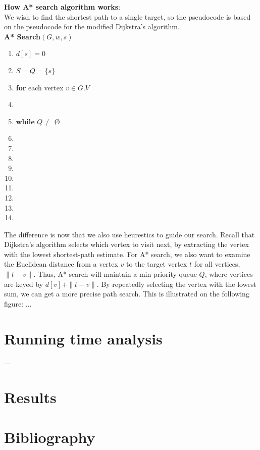 \documentclass[11pt]{article}
\begin{document}
\textbf{How A* search algorithm works}:\\
We wish to find the shortest path to a single target, so the pseudocode is based on the pseudocode for the modified Dijkstra's algorithm.\\

\textbf{A* Search$(G, w, s)$}
\begin{enumerate}
\setlength\itemsep{0em}
\item $d[s] = 0$
\item $S = Q = \{s\}$
\item \textbf{for} each vertex $v \in G.V$
\item {}
\item $\textbf{while } Q \neq  $ \O
\item {}
\item {}
\item \tab{}
\item {}
\item \tab{}
\item \tab{}\tab{}
\item \tab{}\tab{}
\item \tab{}\tab{}
\item \tab{}\tab{}
\end{enumerate}
The difference is now that we also use heurestics to guide our search. Recall that Dijkstra's algorithm selects which vertex to visit next, by extracting the vertex with the lowest shortest-path estimate. For A* search, we also want to examine the Euclidean distance from a vertex $v$ to the target vertex $t$ for all vertices, $\|t-v\|$. Thus, A* search will maintain a min-priority queue $Q$, where vertices are keyed by $d[v]+\|t-v\|$. By repeatedly selecting the vertex with the lowest sum, we can get a more precise path search. This is illustrated on the following figure: ...\\



\section{Running time analysis}
---

\section{Results}
\section{Bibliography}
\end{document}

